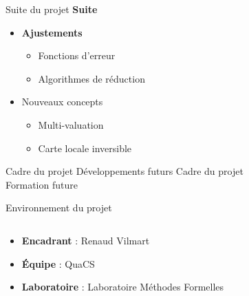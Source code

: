 \documentclass[french, 12pt]{beamer}
\begin{document}
\begin{frame}{Suite du projet}
\textbf{Suite}
\begin{itemize}
    \item \textbf{Ajustements}
    \begin{itemize}
        \item Fonctions d'erreur
        \item Algorithmes de réduction
    \end{itemize}
    \item Nouveaux concepts
    \begin{itemize}
        \item Multi-valuation
        \item Carte locale inversible
    \end{itemize}
\end{itemize}
\end{frame}

\begin{frame}{Cadre du projet Développements futurs}
    \huge{Cadre du projet \\ Formation future}
\end{frame}

\begin{frame}{Environnement du projet}
    \begin{columns}
        \begin{column}{0.6\textwidth}
            \begin{itemize}
                \item \textbf{Encadrant} : Renaud Vilmart
                \item \textbf{Équipe} : QuaCS
                \item \textbf{Laboratoire} : Laboratoire Méthodes Formelles
            \end{itemize}
        \end{column}
        \begin{column}{0.4\textwidth}
            \begin{center}
                
                \vspace{0.5cm}
                
            \end{center}
        \end{column}
    \end{columns}
\end{frame}
\end{document}
